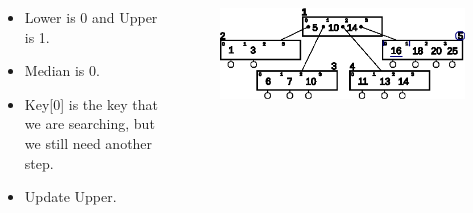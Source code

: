 \documentclass{beamer}
\begin{document}
\begin{frame}[t,allowframebreaks]
    \begin{columns}
        \begin{column}{.4\textwidth}
            \vspace{-1cm}
            \begin{block}{}
                \begin{itemize}
                    \item Lower is 0 and Upper is 1.
                    \item Median is 0.
                    \item Key[0] is the key that we are searching, but we still need another step.
                    \item Update Upper.
                \end{itemize}
            \end{block}
        \end{column}
        \begin{column}{.6\textwidth}
            \vspace{-1cm}
            \begin{block}{}
                \begin{figure}[h!]
                    \includegraphics[width=\linewidth]{resources/made/btree_search_step5.eps}
                \end{figure}    
                \btreeSearchStepFive
            \end{block}
        \end{column}
    \end{columns}

    \framebreak


\end{frame}
\end{document}
